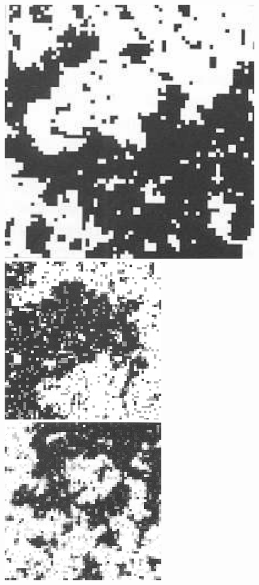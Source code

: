 \documentclass[
  letterpaper,
  enabledeprecatedfontcommands]{report}
\begin{document}
\begin{figure}

\begin{minipage}{0.50\linewidth}

\includegraphics[width=0.5\linewidth,height=\textheight,keepaspectratio]{phase-transitions/Figs/a1_3state.png}

\end{minipage}%
%
\begin{minipage}{0.50\linewidth}

\includegraphics[width=0.5\linewidth,height=\textheight,keepaspectratio]{phase-transitions/Figs/b1_3state.png}

\end{minipage}%
\newline
\begin{minipage}{0.50\linewidth}

\includegraphics[width=0.5\linewidth,height=\textheight,keepaspectratio]{phase-transitions/Figs/a2_3state.png}


\end{minipage}
\end{figure}
\end{document}
